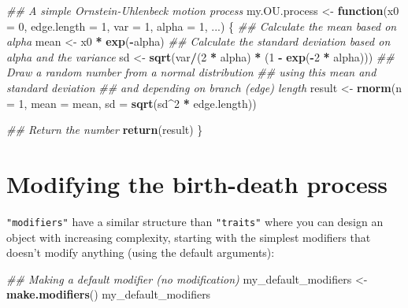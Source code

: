 \documentclass[
]{book}
\newenvironment{Shaded}{\begin{snugshade}}{\end{snugshade}}
\newcommand{\CommentTok}[1]{\textcolor[rgb]{0.56,0.35,0.01}{\textit{#1}}}
\newcommand{\ControlFlowTok}[1]{\textcolor[rgb]{0.13,0.29,0.53}{\textbf{#1}}}
\newcommand{\DataTypeTok}[1]{\textcolor[rgb]{0.13,0.29,0.53}{#1}}
\newcommand{\DecValTok}[1]{\textcolor[rgb]{0.00,0.00,0.81}{#1}}
\newcommand{\KeywordTok}[1]{\textcolor[rgb]{0.13,0.29,0.53}{\textbf{#1}}}
\newcommand{\NormalTok}[1]{#1}
\newcommand{\OperatorTok}[1]{\textcolor[rgb]{0.81,0.36,0.00}{\textbf{#1}}}
\newcommand{\StringTok}[1]{\textcolor[rgb]{0.31,0.60,0.02}{#1}}
\begin{document}
\begin{Shaded}
\begin{Highlighting}[]
\CommentTok{\#\# A simple Ornstein{-}Uhlenbeck motion process}
\NormalTok{my.OU.process \textless{}{-}}\StringTok{ }\ControlFlowTok{function}\NormalTok{(}\DataTypeTok{x0 =} \DecValTok{0}\NormalTok{, }\DataTypeTok{edge.length =} \DecValTok{1}\NormalTok{, }\DataTypeTok{var =} \DecValTok{1}\NormalTok{, }\DataTypeTok{alpha =} \DecValTok{1}\NormalTok{, ...) \{}
    \CommentTok{\#\# Calculate the mean based on alpha}
\NormalTok{    mean \textless{}{-}}\StringTok{ }\NormalTok{x0 }\OperatorTok{*}\StringTok{ }\KeywordTok{exp}\NormalTok{(}\OperatorTok{{-}}\NormalTok{alpha)}
    \CommentTok{\#\# Calculate the standard deviation based on alpha and the variance}
\NormalTok{    sd \textless{}{-}}\StringTok{ }\KeywordTok{sqrt}\NormalTok{(var}\OperatorTok{/}\NormalTok{(}\DecValTok{2} \OperatorTok{*}\StringTok{ }\NormalTok{alpha) }\OperatorTok{*}\StringTok{ }\NormalTok{(}\DecValTok{1} \OperatorTok{{-}}\StringTok{ }\KeywordTok{exp}\NormalTok{(}\OperatorTok{{-}}\DecValTok{2} \OperatorTok{*}\StringTok{ }\NormalTok{alpha)))}
    \CommentTok{\#\# Draw a random number from a normal distribution}
    \CommentTok{\#\# using this mean and standard deviation}
    \CommentTok{\#\# and depending on branch (edge) length}
\NormalTok{    result \textless{}{-}}\StringTok{ }\KeywordTok{rnorm}\NormalTok{(}\DataTypeTok{n =} \DecValTok{1}\NormalTok{, }\DataTypeTok{mean =}\NormalTok{ mean, }\DataTypeTok{sd =} \KeywordTok{sqrt}\NormalTok{(sd}\OperatorTok{\^{}}\DecValTok{2} \OperatorTok{*}\StringTok{ }\NormalTok{edge.length))}

    \CommentTok{\#\# Return the number}
    \KeywordTok{return}\NormalTok{(result)}
\NormalTok{\}}
\end{Highlighting}
\end{Shaded}

\hypertarget{makemodifiers}{%
\chapter{Modifying the birth-death process}\label{makemodifiers}}

\texttt{"modifiers"} have a similar structure than \texttt{"traits"} where you can design an object with increasing complexity, starting with the simplest modifiers that doesn't modify anything (using the default arguments):

\begin{Shaded}
\begin{Highlighting}[]
\CommentTok{\#\# Making a default modifier (no modification)}
\NormalTok{my\_default\_modifiers \textless{}{-}}\StringTok{ }\KeywordTok{make.modifiers}\NormalTok{()}
\NormalTok{my\_default\_modifiers}
\end{Highlighting}
\end{Shaded}
\end{document}
